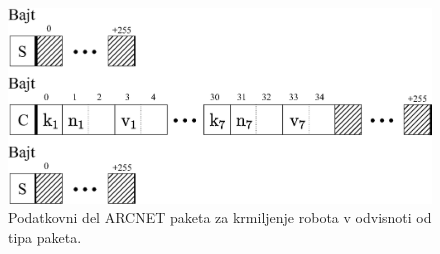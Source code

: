 \begin{figure}[!h]
	\centering
	\includegraphics[scale=0.5]{./Slike/arcnet-data.eps}
	\caption{Podatkovni del ARCNET paketa za krmiljenje robota v odvisnoti od tipa paketa.}
	\label{fig:arcnet-data}
\end{figure}

